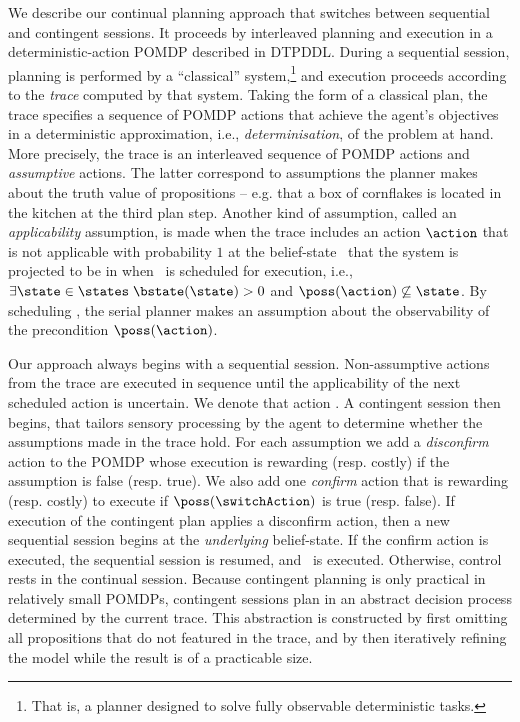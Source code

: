

We describe our continual planning approach that switches between
sequential and contingent sessions. It proceeds by interleaved
planning and execution in a deterministic-action POMDP described in
DTPDDL. During a sequential session, planning is performed by a
``classical'' system,\footnote{That is, a planner designed to solve
fully observable deterministic tasks.}  and execution proceeds
according to the {\em trace} computed by that system. Taking the form
of a classical plan, the trace specifies a sequence of POMDP actions
that achieve the agent's objectives in a deterministic approximation,
i.e., {\em determinisation}, of the problem at hand. More precisely,
the trace is an interleaved sequence of POMDP actions and {\em
assumptive} actions. The latter correspond to assumptions the planner
makes about the truth value of propositions -- e.g. that a box of
cornflakes is located in the kitchen at the third plan step. Another
kind of assumption, called an {\em applicability} assumption, is made
when the trace includes an action $\action$ that is not applicable
with probability $1$ at the belief-state
\bstate\ that the system is projected to be in when \action\ is
scheduled for execution, i.e., $\exists\state\in\states\;
\bstate(\state) > 0$ and $\poss(\action)\not\subseteq\state$. By
scheduling
\action,  the serial planner makes an assumption about the
observability of the precondition $\poss(\action)$.

Our approach always begins with a sequential session. Non-assumptive
actions from the trace are executed in sequence until the
applicability of the next scheduled action is uncertain. We denote
that action \switchAction.  A contingent session then begins, that
tailors sensory processing by the agent to determine whether the
assumptions made in the trace hold. For each assumption we add a {\em
disconfirm} action to the POMDP whose execution is rewarding
(resp. costly) if the assumption is false (resp. true). We also add
one {\em confirm} action that is rewarding (resp. costly) to execute
if $\poss(\switchAction)$ is true (resp. false). If execution of the
contingent plan applies a disconfirm action, then a new sequential
session begins at the {\em underlying} belief-state. If the confirm
action is executed, the sequential session is resumed, and
\switchAction\ is executed. Otherwise, control rests in the continual
session.
Because contingent planning is only practical in relatively small
POMDPs, contingent sessions plan in an abstract decision process
determined by the current trace. This abstraction is constructed by
first omitting all propositions that do not featured in the trace, and
by then iteratively refining the model while the result is of a
practicable size.

